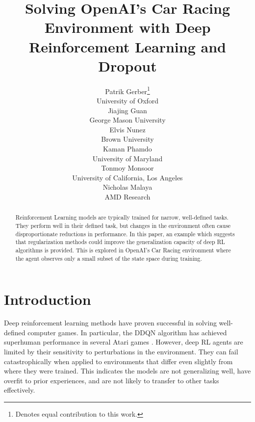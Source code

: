 \documentclass{article}
\title{Solving OpenAI's Car Racing Environment with Deep Reinforcement Learning and Dropout}
\author{
  Patrik Gerber\thanks{Denotes equal contribution to this work.}\\
  University of Oxford \\
  \And
  Jiajing Guan\samethanks \\
  George Mason University \\ 
  \And
  Elvis Nunez\samethanks \\
  Brown University \\
  \And
  Kaman Phamdo\samethanks \\
  University of Maryland \\
  \And
  Tonmoy Monsoor \\
  University of California, Los Angeles \\
  \And
  Nicholas Malaya \\ %
  AMD Research \\ 
}
\begin{document}

\maketitle

\begin{abstract}

  


  
Reinforcement Learning models are typically trained for
narrow, well-defined tasks. They perform well in their defined task,
but changes in the environment often cause disproportionate reductions
in performance. In this paper, an example which suggests that
regularization methods could improve the generalization capacity of
deep RL algorithms is provided. 
This is explored in OpenAI’s Car Racing environment where the agent
observes only a small subset of the state space during training.
\end{abstract}

\vspace{-4mm}
\section{Introduction}
Deep reinforcement learning methods have proven successful in solving
well-defined computer games. In particular, the DDQN algorithm has
achieved superhuman performance in several Atari games
\cite{DQN}. However, deep RL agents are limited by their sensitivity
to perturbations in the environment. They can fail catastrophically
when applied to environments that differ even slightly from where they
were trained\cite{kansky2017schema,taylor2009transfer}. This indicates
the models are not generalizing well, have overfit to prior
experiences, and are not likely to transfer to other tasks
effectively\cite{dibangoye2018learning}. 
\end{document}
